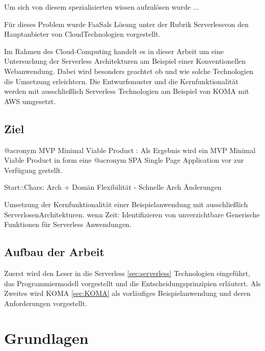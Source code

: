 \documentclass[
12pt,
english,
ngerman,
headsepline,
twoside,
openright,
numbers=noenddot,version=first
]{scrreprt}
\begin{document}
Um sich von diesem spezialisierten wissen aufzulösen wurde ...

Für dieses Problem wurde \glqq FaaS\grqq als Lösung unter der Rubrik \glqq Serverless\grqq von den Hauptanbieter von \glqq Cloud\grqq Technologien vorgestellt.

Im Rahmen des Cloud-Computing handelt es in dieser Arbeit um eine Untersuchung der Serverless Architekturen am Beispiel einer Konventionellen Webanwendung. Dabei wird besonders geachtet ob und wie solche Technologien die Umsetzung erleichtern. Die Entwurfsmuster und die Kernfunktionalität werden mit ausschließlich Serverless Technologien am Beispiel von KOMA mit AWS umgesetzt.


\section{Ziel}
\label{sec:task}


@acronym MVP Minimal Viable Product : \cite{rady2016serverless}
Als Ergebnis wird ein MVP Minimal Viable Product in form eine @acronym SPA Single Page Application vor zur Verfügung gestellt.

Start::Chars: Arch + Domän Flexibilität - Schnelle Arch Änderungen

Umsetzung der Kernfunktionalität einer Beispielanwendung mit ausschließlich \glqq Serverlosen\grqq Architekturen.
wenn Zeit: Identifizieren von unverzichtbare Generische Funktionen für Serverless Anwendungen.


\section{Aufbau der Arbeit}
\label{sec:layout}

Zuerst wird den Leser in die Serverless \ref{sec:serverless} Technologien eingeführt, das Programmiermodell vorgestellt
und die Entscheidungsprinzipien erläutert.
Als Zweites wird KOMA \ref{sec:KOMA} als vorläufiges Beispielanwendung und deren Anforderungen vorgestellt.


\chapter{Grundlagen}
\label{chap:principles}
\end{document}
